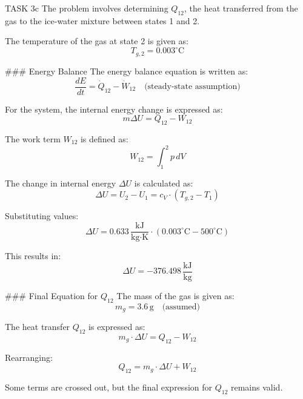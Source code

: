TASK 3c  
The problem involves determining \( Q_{12} \), the heat transferred from the gas to the ice-water mixture between states 1 and 2.

The temperature of the gas at state 2 is given as:  
\[
T_{g,2} = 0.003^\circ \text{C}
\]

### Energy Balance  
The energy balance equation is written as:  
\[
\frac{dE}{dt} = \dot{Q}_{12} - \dot{W}_{12} \quad \text{(steady-state assumption)}
\]

For the system, the internal energy change is expressed as:  
\[
m \Delta U = Q_{12} - W_{12}
\]

The work term \( W_{12} \) is defined as:  
\[
W_{12} = \int_{1}^{2} p \, dV
\]

The change in internal energy \( \Delta U \) is calculated as:  
\[
\Delta U = U_2 - U_1 = c_V \cdot (T_{g,2} - T_1)
\]

Substituting values:  
\[
\Delta U = 0.633 \, \frac{\text{kJ}}{\text{kg·K}} \cdot (0.003^\circ \text{C} - 500^\circ \text{C})
\]

This results in:  
\[
\Delta U = -376.498 \, \frac{\text{kJ}}{\text{kg}}
\]

### Final Equation for \( Q_{12} \)  
The mass of the gas is given as:  
\[
m_g = 3.6 \, \text{g} \quad \text{(assumed)}
\]

The heat transfer \( Q_{12} \) is expressed as:  
\[
m_g \cdot \Delta U = Q_{12} - W_{12}
\]

Rearranging:  
\[
Q_{12} = m_g \cdot \Delta U + W_{12}
\]  

Some terms are crossed out, but the final expression for \( Q_{12} \) remains valid.